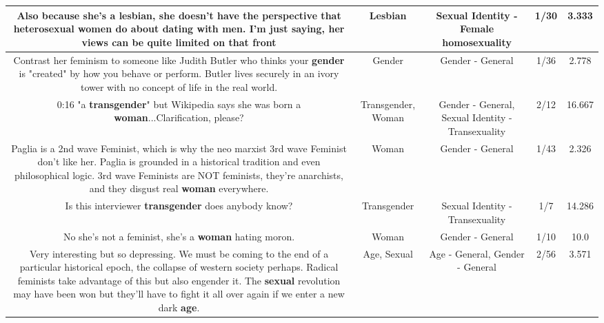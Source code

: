 \documentclass[11pt]{article}
\newlength\mylength
\begin{document}
\begin{center}
\begin{longtable}{|C{.65\mylength}|C{.30\mylength}|C{.12\mylength}|C{.12\mylength}|C{.12\mylength}|}
  \small Also because she's a \textbf{lesbian}, she doesn't have the perspective that heterosexual women do about dating with men. I'm just saying, her views can be quite limited on that front\normalsize   & Lesbian & Sexual Identity - Female homosexuality & 1/30 & 3.333 \\  \hline
  \small Contrast her feminism to someone like Judith Butler who thinks your \textbf{gender} is "created" by how you behave or perform.  Butler lives securely in an ivory tower with no concept of life in the real world.\normalsize   & Gender & Gender - General & 1/36 & 2.778 \\  \hline
  \small 0:16 "a \textbf{transgender}" but Wikipedia says she was born a \textbf{woman}...Clarification, please?\normalsize   & Transgender, Woman & Gender - General, Sexual Identity - Transexuality & 2/12 & 16.667 \\  \hline
  \small Paglia is a 2nd wave Feminist, which is why the neo marxist 3rd wave Feminist don't like her. Paglia is grounded in a historical tradition and even philosophical logic. 3rd wave Feminists are NOT feminists, they're anarchists, and they disgust real \textbf{woman} everywhere.\normalsize   & Woman & Gender - General & 1/43 & 2.326 \\  \hline
  \small Is this interviewer \textbf{transgender} does anybody know?\normalsize   & Transgender & Sexual Identity - Transexuality & 1/7 & 14.286 \\  \hline
  \small No she's not a feminist, she's a \textbf{woman} hating moron.\normalsize   & Woman & Gender - General & 1/10 & 10.0 \\  \hline
  \small Very interesting but so depressing. We must be coming to the end of a particular historical epoch, the collapse of western society perhaps.  Radical feminists take advantage of this but also engender it. The \textbf{sexual} revolution may have been won but they'll have to fight it all over again if we enter a new dark \textbf{age}.\normalsize   & Age, Sexual & Age - General, Gender - General & 2/56 & 3.571 \\  \hline

\end{longtable}
\end{center}
\end{document}

